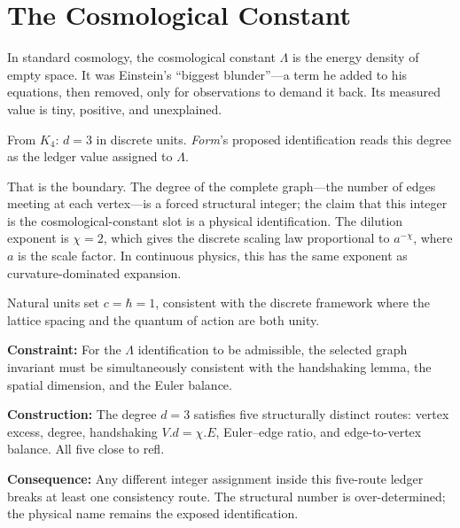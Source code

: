 \documentclass[11pt,a4paper]{book}
\def\cdot{.}%
\def\texttt#1{#1}%
\begin{document}
\chapter{The Cosmological Constant}
\label{ch:cosmological-constant}

In standard cosmology, the cosmological constant $\Lambda$ is the energy density of empty space. It was Einstein's ``biggest blunder''---a term he added to his equations, then removed, only for observations to demand it back. Its measured value is tiny, positive, and unexplained.

From $K_4$: $d = 3$ in discrete units.  \textit{Form}'s proposed identification reads this degree as the ledger value assigned to $\Lambda$.

That is the boundary. The degree of the complete graph---the number of edges meeting at each vertex---is a forced structural integer; the claim that this integer is the cosmological-constant slot is a physical identification. The dilution exponent is $\chi = 2$, which gives the discrete scaling law proportional to $a^{-\chi}$, where $a$ is the scale factor. In continuous physics, this has the same exponent as curvature-dominated expansion.

Natural units set $c = \hbar = 1$, consistent with the discrete framework where the lattice spacing and the quantum of action are both unity.

\textbf{Constraint:} For the $\Lambda$ identification to be admissible, the selected graph invariant must be simultaneously consistent with the handshaking lemma, the spatial dimension, and the Euler balance.

\textbf{Construction:} The degree $d = 3$ satisfies five structurally distinct routes: vertex excess, degree, handshaking $V \cdot d = \chi \cdot E$, Euler--edge ratio, and edge-to-vertex balance. All five close to \texttt{refl}.

\textbf{Consequence:} Any different integer assignment inside this five-route ledger breaks at least one consistency route. The structural number is over-determined; the physical name remains the exposed identification.
\end{document}
